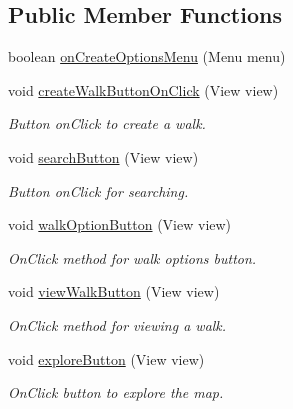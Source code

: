\subsection*{Public Member Functions}
\begin{DoxyCompactItemize}
\item 
boolean \hyperlink{classuk_1_1ac_1_1swan_1_1digitaltrails_1_1activities_1_1_home_activity_a172de223495cf719ea3dba4d0bf19d39}{on\+Create\+Options\+Menu} (Menu menu)
\item 
void \hyperlink{classuk_1_1ac_1_1swan_1_1digitaltrails_1_1activities_1_1_home_activity_a5e7988e0de980a1cc4819ec91eddb680}{create\+Walk\+Button\+On\+Click} (View view)
\begin{DoxyCompactList}\small\item\em Button on\+Click to create a walk. \end{DoxyCompactList}\item 
void \hyperlink{classuk_1_1ac_1_1swan_1_1digitaltrails_1_1activities_1_1_home_activity_ad6885ca213194f4d14a2d061cfabd1d7}{search\+Button} (View view)
\begin{DoxyCompactList}\small\item\em Button on\+Click for searching. \end{DoxyCompactList}\item 
void \hyperlink{classuk_1_1ac_1_1swan_1_1digitaltrails_1_1activities_1_1_home_activity_a77147b932dd66ecd0ff4d4140238477b}{walk\+Option\+Button} (View view)
\begin{DoxyCompactList}\small\item\em On\+Click method for walk options button. \end{DoxyCompactList}\item 
void \hyperlink{classuk_1_1ac_1_1swan_1_1digitaltrails_1_1activities_1_1_home_activity_a73b4cadc71a2cec477bbb7196e6d7cbb}{view\+Walk\+Button} (View view)
\begin{DoxyCompactList}\small\item\em On\+Click method for viewing a walk. \end{DoxyCompactList}\item 
void \hyperlink{classuk_1_1ac_1_1swan_1_1digitaltrails_1_1activities_1_1_home_activity_aef682d092ce7a34d8a0dc8227022bb86}{explore\+Button} (View view)
\begin{DoxyCompactList}\small\item\em On\+Click button to explore the map. \end{DoxyCompactList}\item 

\end{DoxyCompactItemize}
